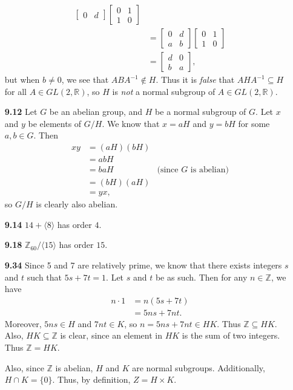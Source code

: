 \documentclass[11pt,letterpaper]{article}
\begin{document}
\begin{enumerate}
\begin{align*}
\begin{bmatrix}
        0 & d
    \end{bmatrix}
    \begin{bmatrix}
        0 & 1\\
        1 & 0
    \end{bmatrix} \\
    &=
    \begin{bmatrix}
        0 & d\\
        a & b
    \end{bmatrix}
    \begin{bmatrix}
        0 & 1\\
        1 & 0
    \end{bmatrix} \\
    &=
    \begin{bmatrix}
        d & 0\\
        b & a
    \end{bmatrix},
\end{align*}
but when $b\neq 0$, we see that $ABA^{-1}\notin H$. Thus it is \textit{false} that $AHA^{-1}\subseteq H$ for all $A\in GL(2,\mathbb{R})$, so $H$ is \textit{not} a normal subgroup of $A\in GL(2,\mathbb{R})$.
\item[\textbf{9.12}] Let $G$ be an abelian group, and $H$ be a normal subgroup of $G$. Let $x$ and $y$ be elements of $G/H$. We know that $x=aH$ and $y=bH$ for some $a,b\in G$. Then
\begin{align*}
    xy &= (aH)(bH) \\
    &= abH \\
    &= baH & \mbox{(since $G$ is abelian)}\\
    &= (bH)(aH) \\
    &= yx,
\end{align*}
so $G/H$ is clearly also abelian.
\item[\textbf{9.14}] $14+\langle 8 \rangle$ has order $4$.
\item[\textbf{9.18}] $\mathbb{Z}_{60}/\langle 15 \rangle$ has order $15$.
\item[\textbf{9.34}] Since 5 and 7 are relatively prime, we know that there exists integers $s$ and $t$ such that $5s+7t=1$. Let $s$ and $t$ be as such. Then for any $n\in \mathbb{Z}$, we have
\begin{align*}
    n\cdot 1&=n(5s+7t) \\
    &=5ns+7nt.
\end{align*}
Moreover, $5ns\in H$ and $7nt\in K$, so $n=5ns+7nt\in HK$. Thus $\mathbb{Z}\subseteq HK$. Also, $HK\subseteq \mathbb{Z}$ is clear, since an element in $HK$ is the sum of two integers. Thus $\mathbb{Z}=HK$. 

Also, since $\mathbb{Z}$ is abelian, $H$ and $K$ are normal subgroups. Additionally, $H\cap K=\{0\}$. Thus, by definition, $Z=H\times K$.
\end{enumerate}
\end{document}

